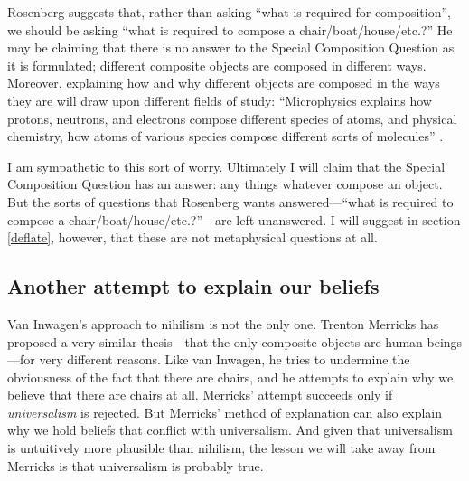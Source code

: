 \documentclass[11pt]{article}
\begin{document}
\begin{spacing}{1.5}
Rosenberg suggests that, rather than asking ``what is required for
composition'', we should be asking ``what is required to compose a
chair/boat/house/etc.?''  He may be claiming that there is no answer
to the Special Composition Question as it is formulated; different
composite objects are composed in different ways.  Moreover,
explaining how and why different objects are composed in the ways they
are will draw upon different fields of study: ``Microphysics explains
how protons, neutrons, and electrons compose different species of
atoms, and physical chemistry, how atoms of various species compose
different sorts of molecules'' \citep[706]{rosenberg1993}.

I am sympathetic to this sort of worry.  Ultimately I will claim that
the Special Composition Question has an answer: any things whatever
compose an object.  But the sorts of questions that Rosenberg wants
answered---``what is required to compose a
chair/boat/house/etc.?''---are left unanswered.  I will suggest in
section \ref{deflate}, however, that these are not metaphysical
questions at all.

\subsection{Another attempt to explain our beliefs}
\label{explain-merricks}
Van Inwagen's approach to nihilism is not the only one.  Trenton
Merricks has proposed a very similar thesis---that the only composite
objects are human beings---for very different reasons.  Like van
Inwagen, he tries to undermine the obviousness of the fact that there
are chairs, and he attempts to explain why we believe that there are
chairs at all.  Merricks' attempt succeeds only if {\em universalism}
is rejected.  But Merricks' method of explanation can also explain why
we hold beliefs that conflict with universalism.  And given that
universalism is untuitively more plausible than nihilism, the lesson
we will take away from Merricks is that universalism is probably true.

\ifstandalone
\end{spacing}


\fi
\end{document}
